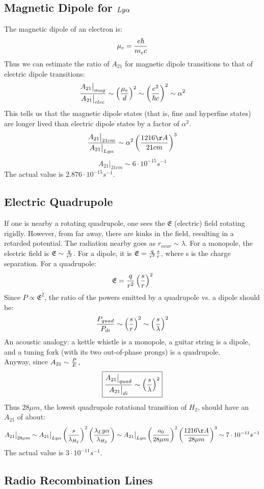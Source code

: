 \documentclass[11pt]{article}
\def\eval#1{\big|_{#1}}
\def\ato{{A_{21}}}
\def\e#1{\cdot10^{#1}}
\begin{document}
\subsection*{ Magnetic Dipole for $Ly\alpha$}

The magnetic dipole of an electron is:
$$\mu_e={e\hbar\over m_ec}$$
Thus we can estimate the ratio of $\ato$ for magnetic dipole transitions to
that of electric dipole transitions:
$${\ato\eval{mag}\over\ato\eval{elec}}\sim\left({\mu_e\over d}\right)^2
\sim\left({e^2\over\hbar c}\right)^2\sim\alpha^2$$
This tells us that the magnetic dipole states (that is, fine and hyperfine
states) are longer lived than electric dipole states by a factor of $\alpha^2$.
$${\ato\eval{21cm}\over\ato\eval{Ly\alpha}}\sim\alpha^2
\left({1216\AA\over21cm}\right)^3$$
$$\ato\eval{21cm}\sim6\e{-15}s^{-1}$$
The actual value is $2.876\e{-15}s^{-1}$.

\def\mfe{\mathfrak{E}}
\subsection*{ Electric Quadrupole}

If one is nearby a rotating quadrupole, one sees the $\mfe$  (electric)
field rotating rigidly.
However, from far away, there are kinks in the field, resulting in a retarded
potential.  The radiation nearby goes as $r_{near}\sim\lambda$.  For a monopole,
the electric field is $\mfe\sim{q\over r^2}$.  For a dipole, it is 
$\mfe={q\over r^2}
{s\over r}$, where s is the charge separation.  For a quadrupole: 
$$\mfe={q\over r^2}\left({s\over r}\right)^2$$
Since $P\propto \mfe^2$, the ratio of the powers emitted by a
quadrupole vs. a dipole should be:
$${P_{quad}\over P_{di}}\sim\left({s\over r}\right)^2
\sim\left({s\over\lambda}\right)^2$$
An acoustic analogy: a kettle whistle is a monopole, a
guitar string is a dipole, and a tuning fork (with its two out-of-phase
prongs) is a quadrupole.\\

Anyway, since $\ato\sim{P\over E}$,
$$\boxed{{\ato\eval{quad}\over\ato\eval{di}}
\sim\left({s\over\lambda}\right)^2}$$
Thus $28\mu m$, the lowest quadrupole rotational transition of
$H_2$, should have an $\ato$ of about:
$$\ato\eval{28\mu m}\sim\ato\eval\lya\left({s\over\lambda_{H_2}}\right)^2
\left({\lambda_\lya\over \lambda_{H_2}}\right)
\sim\ato\eval\lya\left({a_0\over 28\mu m}\right)^2
\left({1216\AA\over 28\mu m}\right)^3
\sim7\e{-11}s^{-1}$$
The actual value is $3\e{-11}s^{-1}$.

\subsection*{ Radio Recombination Lines}
\end{document}
